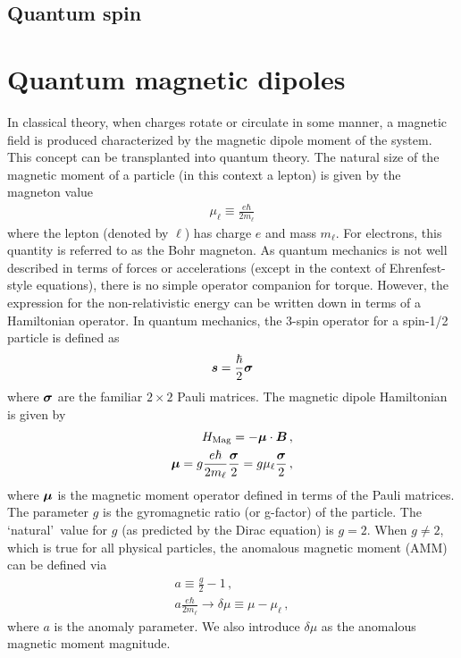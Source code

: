 \subsection{Quantum spin}
\label{sec:qspin}

\section{Quantum magnetic dipoles}
\label{sec:mom}
In classical theory, when charges rotate or circulate in some manner, a magnetic field is produced characterized by the magnetic dipole moment of the system. This concept can be transplanted into quantum theory. The natural size of the magnetic moment of a particle (in this context a lepton) is given by the magneton value
\begin{align}
    \label{mag:1}
    \mu_{\ell}\equiv\frac{e\hbar}{2m_{\ell}}
\end{align}
where the lepton (denoted by $\ell$) has charge $e$ and mass $m_{\ell}$. For electrons, this quantity is referred to as the Bohr magneton. As quantum mechanics is not well described in terms of forces or accelerations (except in the context of Ehrenfest-style equations), there is no simple operator companion for torque. However, the expression for the non-relativistic energy can be written down in terms of a Hamiltonian operator. In quantum mechanics, the 3-spin operator for a spin-1/2 particle is defined as
\begin{align}
    \label{qspin:1}
    \boldsymbol{ s}=\frac{\hbar}{2}\boldsymbol{\sigma}
\end{align}
where $\boldsymbol{\sigma}$ are the familiar $2\times2$ Pauli matrices. The magnetic dipole Hamiltonian is given by
\begin{align}
	\label{mag:2}
    {H}_{\mathrm{Mag}}=-\boldsymbol{\mu}\cdot\boldsymbol{B}\,,\\
    \boldsymbol{\mu}=g\frac{e\hbar}{2m_{\ell}}\frac{\boldsymbol{\sigma}}{2}=g\mu_{\ell}\frac{\boldsymbol{\sigma}}{2}\,,
\end{align}
where $\boldsymbol{\mu}$ is the magnetic moment operator defined in terms of the Pauli matrices. The parameter $g$ is the gyromagnetic ratio (or g-factor) of the particle. The \lq natural\rq\ value for $g$ (as predicted by the Dirac equation) is $g=2$. When $g\neq2$, which is true for all physical particles, the anomalous magnetic moment (AMM) can be defined via 
\begin{align}
    \label{amm:1}
    a\equiv\frac{g}{2}-1\,,\\
    \label{amm:2} a\frac{e\hbar}{2m_{\ell}}\rightarrow\delta\mu\equiv\mu-\mu_{\ell}\,,
\end{align}
where $a$ is the anomaly parameter. We also introduce $\delta\mu$ as the anomalous magnetic moment magnitude.

